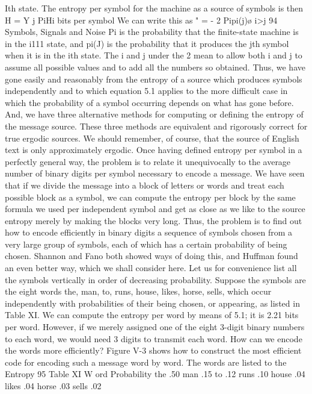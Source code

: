{{{Ith state. The entropy per symbol for the machine as a source of
symbols is then
H = Y j PiHi bits per symbol
We can write this as
" = - 2 Pipi(j)\o%
i>j
94
Symbols, Signals and Noise
Pi is the probability that the finite-state machine is in the i111 state,
and pi(J) is the probability that it produces the jth symbol when
it is in the ith state. The i and j under the 2 mean to allow both i
and j to assume all possible values and to add all the numbers so
obtained.
Thus, we have gone easily and reasonably from the entropy of
a source which produces symbols independently and to which
equation 5.1 applies to the more difficult case in which the probability
of a symbol occurring depends on what has gone before. And,
we have three alternative methods for computing or defining the
entropy of the message source. These three methods are equivalent
and rigorously correct for true ergodic sources. We should remember,
of course, that the source of English text is only approximately
ergodic.
Once having defined entropy per symbol in a perfectly general
way, the problem is to relate it unequivocally to the average
number of binary digits per symbol necessary to encode a message.
We have seen that if we divide the message into a block of letters
or words and treat each possible block as a symbol, we can compute
the entropy per block by the same formula we used per
independent symbol and get as close as we like to the source
entropy merely by making the blocks very long.
Thus, the problem is to find out how to encode efficiently in
binary digits a sequence of symbols chosen from a very large group
of symbols, each of which has a certain probability of being chosen.
Shannon and Fano both showed ways of doing this, and Huffman
found an even better way, which we shall consider here.
Let us for convenience list all the symbols vertically in order of
decreasing probability. Suppose the symbols are the eight words
the, man, to, runs, house, likes, horse, sells, which occur independently
with probabilities of their being chosen, or appearing, as
listed in Table XI.
We can compute the entropy per word by means of 5.1; it is 2.21
bits per word. However, if we merely assigned one of the eight
3-digit binary numbers to each word, we would need 3 digits to
transmit each word. How can we encode the words more efficiently?
Figure V-3 shows how to construct the most efficient code for
encoding such a message word by word. The words are listed to the
Entropy 95
Table XI
W ord Probability
the .50
man .15
to .12
runs .10
house .04
likes .04
horse .03
sells .02
}}}
